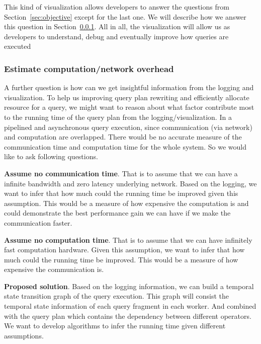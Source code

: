 \documentclass[11pt]{article}
\begin{document}
	This kind of visualization allows developers to answer the questions from Section~\ref{sec:objective} except for the last one. We will describe how we answer this question in Section~\ref{sec:overhead}. All in all, the visualization will allow us as developers to understand, debug and eventually improve how queries are executed

\subsubsection{Estimate computation/network overhead}
\label{sec:overhead}

A further question is  how can we get insightful information from the logging and visualization. To help us improving query plan rewriting and efficiently allocate resource for a query, we might want to reason about what factor contribute most to the running time of the query plan from the logging/visualization. In a pipelined and asynchronous query execution, since communication (via network) and computation are overlapped. There would be no accurate measure of the communication time and computation time for the whole system.  So we would like to ask following questions.

\noindent\textbf{Assume no communication time}.  That is to assume that we can have a infinite bandwidth and zero latency underlying network. Based on the logging, we want to infer that how much could the running time be improved given this assumption. This would be a measure of how expensive the computation is and could demonstrate the best performance gain we can have if we make the communication faster. 

\noindent\textbf{Assume no computation time}.  That is to assume that we can have infinitely fast computation hardware. Given this assumption, we want to infer that how much could the running time be improved. This would be a measure of how expensive the communication is.

\noindent\textbf{Proposed solution}.  Based on the logging information, we can build a temporal state transition graph of the query execution. This graph will consist the temporal state information of each query fragment in each worker. And combined with the query plan which contains the dependency between different operators. We want to develop algorithms to infer the running time given different assumptions.
\end{document}
